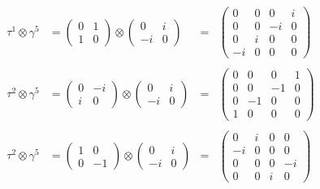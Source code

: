 \begin{align*}
    \tau^1 \otimes \gamma^5 &= 
    \begin{pmatrix*}
        0 & 1 \\
        1 & 0
    \end{pmatrix*}
    \otimes
    \begin{pmatrix*}
        0 & i \\
        -i & 0
    \end{pmatrix*}
    & = &
    \begin{pmatrix*}
        0 & 0 & 0 & i \\
        0 & 0 & -i & 0 \\
        0 & i & 0 & 0 \\
        -i & 0 & 0 & 0
    \end{pmatrix*}
    \\~\\
     \tau^2 \otimes \gamma^5 &= 
    \begin{pmatrix*}
        0 & -i \\
        i & 0
    \end{pmatrix*}
    \otimes
    \begin{pmatrix*}
        0 & i \\
        -i & 0
    \end{pmatrix*}
    & = &
    \begin{pmatrix*}
        0 & 0 & 0 & 1 \\
        0 & 0 & -1 & 0 \\
        0 & -1 & 0 & 0 \\
        1 & 0 & 0 & 0
    \end{pmatrix*}
    \\~\\
     \tau^2 \otimes \gamma^5 &= 
     \begin{pmatrix*}
        1 & 0 \\
        0 & -1
    \end{pmatrix*}
    \otimes
    \begin{pmatrix*}
        0 & i \\
        -i & 0
    \end{pmatrix*}
    & = &
    \begin{pmatrix*}
        0 & i & 0 & 0 \\
        -i & 0 & 0 & 0 \\
        0 & 0 & 0 & -i \\
        0 & 0 & i & 0
    \end{pmatrix*}
\end{align*}








